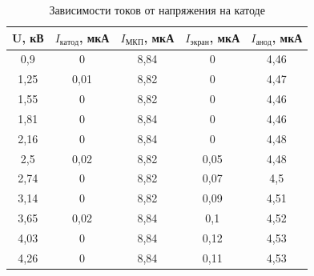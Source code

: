 \documentclass[a4paper,12pt]{article}
\begin{document}
\begin{table}[h]
\begin{center}
\caption{Зависимости токов от напряжения на катоде}
\label{table:katod}
\begin{tabular}{|ccccc|}
\hline
\multicolumn{1}{|c|}{\textbf{U}, кВ} & \multicolumn{1}{c|}{\textbf{$I_{катод}$}, мкА} & \multicolumn{1}{c|}{\textbf{$I_{МКП}$}, мкА} & \multicolumn{1}{c|}{\textbf{$I_{экран}$}, мкА} & {\textbf{$I_{анод}$}, мкА} \\ \hline
\multicolumn{1}{|c|}{0,9}            & \multicolumn{1}{c|}{0}                      & \multicolumn{1}{c|}{8,84}            & \multicolumn{1}{c|}{0}                 & 4,46             \\ \hline
\multicolumn{1}{|c|}{1,25}           & \multicolumn{1}{c|}{0,01}                   & \multicolumn{1}{c|}{8,82}            & \multicolumn{1}{c|}{0}                 & 4,47             \\ \hline
\multicolumn{1}{|c|}{1,55}           & \multicolumn{1}{c|}{0}                      & \multicolumn{1}{c|}{8,82}            & \multicolumn{1}{c|}{0}                 & 4,46             \\ \hline
\multicolumn{1}{|c|}{1,81}           & \multicolumn{1}{c|}{0}                      & \multicolumn{1}{c|}{8,84}            & \multicolumn{1}{c|}{0}                 & 4,46             \\ \hline
\multicolumn{1}{|c|}{2,16}           & \multicolumn{1}{c|}{0}                      & \multicolumn{1}{c|}{8,84}            & \multicolumn{1}{c|}{0}                 & 4,48             \\ \hline
\multicolumn{1}{|c|}{2,5}            & \multicolumn{1}{c|}{0,02}                   & \multicolumn{1}{c|}{8,82}            & \multicolumn{1}{c|}{0,05}              & 4,48             \\ \hline
\multicolumn{1}{|c|}{2,74}           & \multicolumn{1}{c|}{0}                      & \multicolumn{1}{c|}{8,82}            & \multicolumn{1}{c|}{0,07}              & 4,5              \\ \hline
\multicolumn{1}{|c|}{3,14}           & \multicolumn{1}{c|}{0}                      & \multicolumn{1}{c|}{8,82}            & \multicolumn{1}{c|}{0,09}              & 4,51             \\ \hline
\multicolumn{1}{|c|}{3,65}           & \multicolumn{1}{c|}{0,02}                   & \multicolumn{1}{c|}{8,84}            & \multicolumn{1}{c|}{0,1}               & 4,52             \\ \hline
\multicolumn{1}{|c|}{4,03}           & \multicolumn{1}{c|}{0}                      & \multicolumn{1}{c|}{8,84}            & \multicolumn{1}{c|}{0,12}              & 4,53             \\ \hline
\multicolumn{1}{|c|}{4,26}           & \multicolumn{1}{c|}{0}                      & \multicolumn{1}{c|}{8,84}            & \multicolumn{1}{c|}{0,11}              & 4,53             \\ \hline
\end{tabular}
\end{center}
\end{table}
\end{document}
